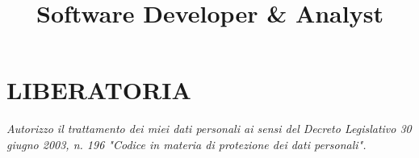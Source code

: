 \documentclass[9pt,a4paper,sans]{moderncv}
\title{Software Developer \& Analyst}
\begin{document}
\makecvtitle













\section{LIBERATORIA}
\textit{Autorizzo il trattamento dei miei dati personali ai sensi del Decreto
Legislativo 30 giugno 2003, n. 196 "Codice in materia di protezione dei dati personali".}
\end{document}
